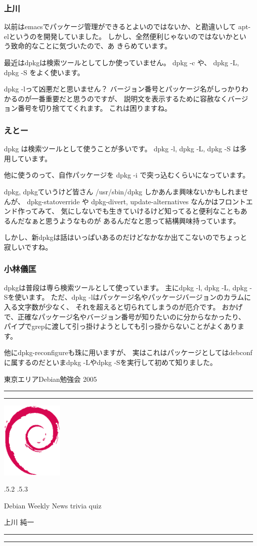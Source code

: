 \documentclass[mingoth,a4paper]{jsarticle}
\makeatletter
\renewcommand{\section}{\@startsection{section}{1}{\z@}%
    {\Cvs \@plus.5\Cdp \@minus.2\Cdp}%
    {.5\Cvs \@plus.3\Cdp}%
    {\normalfont\Large\headfont\raggedright\centering}} %
\newcommand{\dancersection}[2]{%
\newpage
東京エリアDebian勉強会 2005
\hrule
\vspace{0.5mm}
\hrule
\hfill{}\includegraphics[width=3cm]{image200502/openlogo-nd.eps}\\
\vspace{-4cm}
\begin{center}
  \section{#1}
\end{center}
\hfill{}#2\hspace{3cm}\space\\
\hrule
\hrule
\vspace{1cm}
}
\makeatother
\begin{document}
\subsubsection{上川}

以前はemacsでパッケージ管理ができるとよいのではないか、と勘違いして
apt-elというのを開発していました。
しかし、全然便利じゃないのではないかという致命的なことに気づいたので、あ
きらめています。

最近はdpkgは検索ツールとしてしか使っていません。
dpkg -c や、 dpkg -L, dpkg -S をよく使います。

dpkg -lって凶悪だと思いません？
バージョン番号とパッケージ名がしっかりわかるのが一番重要だと思うのですが、
説明文を表示するために容赦なくバージョン番号を切り捨ててくれます。
これは困りますね。


\subsubsection{えとー}

dpkg は検索ツールとして使うことが多いです。
dpkg -l, dpkg -L, dpkg -S は多用しています。

他に使うのって、自作パッケージを dpkg -i で突っ込むくらいになっています。

dpkg, dpkgていうけど皆さん /usr/sbin/dpkg しかあんま興味ないかもしれませんが、
dpkg-statoverride や dpkg-divert, update-alternatives
なんかはフロントエンド作ってみて、
気にしないでも生きていけるけど知ってると便利なこともあるんだなぁと思うようなものが
あるんだなと思って結構興味持っています。

しかし、新dpkgは話はいっぱいあるのだけどなかなか出てこないのでちょっと寂しいですね。


\subsubsection{小林儀匡}

dpkgは普段は専ら検索ツールとして使っています。
主にdpkg -l, dpkg -L, dpkg -Sを使います。
ただ、dpkg -lはパッケージ名やパッケージバージョンのカラムに入る文字数が少なく、
それを超えると切られてしまうのが厄介です。
おかげで、正確なパッケージ名やバージョン番号が知りたいのに分からなかったり、
パイプでgrepに渡して引っ掛けようとしても引っ掛からないことがよくあります。

他にdpkg-reconfigureも珠に用いますが、
実はこれはパッケージとしてはdebconfに属するのだといまdpkg -Lやdpkg -Sを実行して初めて知りました。

\dancersection{Debian Weekly News trivia quiz}{上川 純一}
\end{document}
